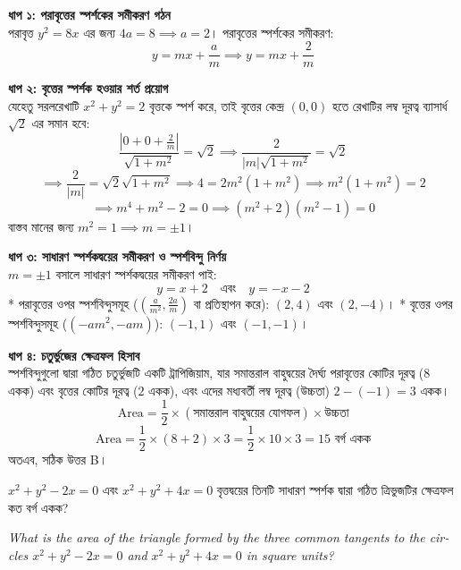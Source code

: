 \documentclass[12pt, a4paper]{article}
\begin{document}
\begin{tcolorbox}[solutionbox={সমাধান (Solution)}]
    \noindent
    \textbf{ধাপ ১: পরাবৃত্তের স্পর্শকের সমীকরণ গঠন} \\
    পরাবৃত্ত $y^2 = 8x$ এর জন্য $4a = 8 \implies a = 2$। 
    পরাবৃত্তের স্পর্শকের সমীকরণ:
    \[ y = mx + \frac{a}{m} \implies y = mx + \frac{2}{m} \]
    
    \vspace{0.5em}
    \noindent\textbf{ধাপ ২: বৃত্তের স্পর্শক হওয়ার শর্ত প্রয়োগ} \\
    যেহেতু সরলরেখাটি $x^2 + y^2 = 2$ বৃত্তকে স্পর্শ করে, তাই বৃত্তের কেন্দ্র $(0,0)$ হতে রেখাটির লম্ব দূরত্ব ব্যাসার্ধ $\sqrt{2}$ এর সমান হবে:
    \[ \frac{\left|0 + 0 + \frac{2}{m}\right|}{\sqrt{1 + m^2}} = \sqrt{2} \implies \frac{2}{|m|\sqrt{1 + m^2}} = \sqrt{2} \]
    \[ \implies \frac{2}{|m|} = \sqrt{2}\sqrt{1 + m^2} \implies 4 = 2m^2(1 + m^2) \implies m^2(1 + m^2) = 2 \]
    \[ \implies m^4 + m^2 - 2 = 0 \implies (m^2 + 2)(m^2 - 1) = 0 \]
    বাস্তব মানের জন্য $m^2 = 1 \implies m = \pm 1$।
    
    \vspace{0.5em}
    \noindent\textbf{ধাপ ৩: সাধারণ স্পর্শকদ্বয়ের সমীকরণ ও স্পর্শবিন্দু নির্ণয়} \\
    $m = \pm 1$ বসালে সাধারণ স্পর্শকদ্বয়ের সমীকরণ পাই:
    \[ y = x + 2 \quad \text{এবং} \quad y = -x - 2 \]
    * পরাবৃত্তের ওপর স্পর্শবিন্দুসমূহ ($(\frac{a}{m^2}, \frac{2a}{m})$ বা প্রতিস্থাপন করে): $(2, 4)$ এবং $(2, -4)$।
    * বৃত্তের ওপর স্পর্শবিন্দুসমূহ ($(-am^2, -am)$): $(-1, 1)$ এবং $(-1, -1)$।
    
    \vspace{0.5em}
    \noindent\textbf{ধাপ ৪: চতুর্ভুজের ক্ষেত্রফল হিসাব} \\
    স্পর্শবিন্দুগুলো দ্বারা গঠিত চতুর্ভুজটি একটি ট্রাপিজিয়াম, যার সমান্তরাল বাহুদ্বয়ের দৈর্ঘ্য পরাবৃত্তের কোটির দূরত্ব ($8$ একক) এবং বৃত্তের কোটির দূরত্ব ($2$ একক), এবং এদের মধ্যবর্তী লম্ব দূরত্ব (উচ্চতা) $2 - (-1) = 3$ একক।
    \[ \text{Area} = \frac{1}{2} \times (\text{সমান্তরাল বাহুদ্বয়ের যোগফল}) \times \text{উচ্চতা} \]
    \[ \text{Area} = \frac{1}{2} \times (8 + 2) \times 3 = \frac{1}{2} \times 10 \times 3 = 15 \text{ বর্গ একক} \]
    অতএব, সঠিক উত্তর B।
\end{tcolorbox}

\begin{tcolorbox}[questionbox={প্রশ্ন (Question) 31}]
    \noindent
    $x^2 + y^2 - 2x = 0$ এবং $x^2 + y^2 + 4x = 0$ বৃত্তদ্বয়ের তিনটি সাধারণ স্পর্শক দ্বারা গঠিত ত্রিভুজটির ক্ষেত্রফল কত বর্গ একক?
    
    \vspace{0.8em}
    \begin{english}
    \noindent\textit{\color{darkgray}
    What is the area of the triangle formed by the three common tangents to the circles $x^2 + y^2 - 2x = 0$ and $x^2 + y^2 + 4x = 0$ in square units?
    }
    \end{english}
\end{tcolorbox}
\end{document}
